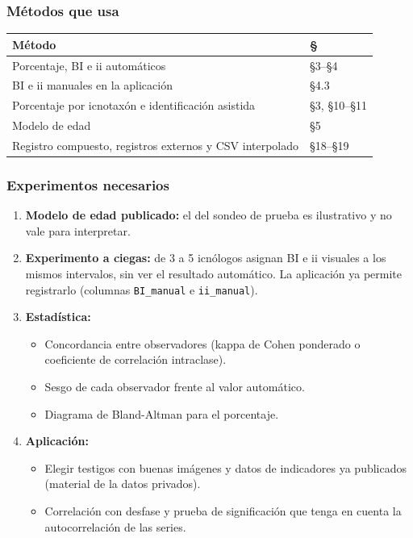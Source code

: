 \documentclass[
  10pt,
]{article}
\providecommand{\tightlist}{%
  \setlength{\itemsep}{0pt}\setlength{\parskip}{0pt}}
\begin{document}
\hypertarget{muxe9todos-que-usa-2}{%
\subsubsection{Métodos que usa}\label{muxe9todos-que-usa-2}}

\begin{longtable}[]{@{}ll@{}}
\toprule\noalign{}
Método & § \\
\midrule\noalign{}
\endhead
\bottomrule\noalign{}
\endlastfoot
Porcentaje, BI e ii automáticos & §3--§4 \\
BI e ii manuales en la aplicación & §4.3 \\
Porcentaje por icnotaxón e identificación asistida & §3, §10--§11 \\
Modelo de edad & §5 \\
Registro compuesto, registros externos y CSV interpolado & §18--§19 \\
\end{longtable}

\hypertarget{experimentos-necesarios-1}{%
\subsubsection{Experimentos
necesarios}\label{experimentos-necesarios-1}}

\begin{enumerate}
\def\labelenumi{\arabic{enumi}.}
\setcounter{enumi}{-1}
\tightlist
\item
  \textbf{Modelo de edad publicado:} el del sondeo de prueba es
  ilustrativo y no vale para interpretar.
\item
  \textbf{Experimento a ciegas:} de 3 a 5 icnólogos asignan BI e ii
  visuales a los mismos intervalos, sin ver el resultado automático. La
  aplicación ya permite registrarlo (columnas \texttt{BI\_manual} e
  \texttt{ii\_manual}).
\item
  \textbf{Estadística:}

  \begin{itemize}
  \tightlist
  \item
    Concordancia entre observadores (kappa de Cohen ponderado o
    coeficiente de correlación intraclase).
  \item
    Sesgo de cada observador frente al valor automático.
  \item
    Diagrama de Bland-Altman para el porcentaje.
  \end{itemize}
\item
  \textbf{Aplicación:}

  \begin{itemize}
  \tightlist
  \item
    Elegir testigos con buenas imágenes y datos de indicadores ya
    publicados (material de la datos privados).
  \item
    Correlación con desfase y prueba de significación que tenga en
    cuenta la autocorrelación de las series.
  \end{itemize}
\end{enumerate}
\end{document}
